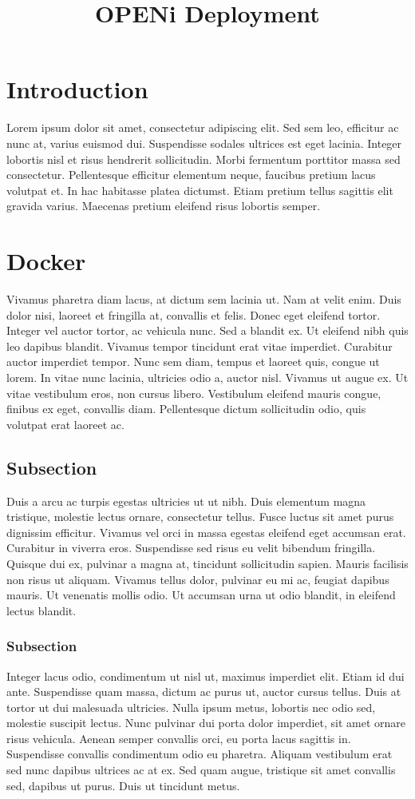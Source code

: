\documentclass[10pt,a4paper]{article}
\title{OPENi Deployment}
\begin{document}
\maketitle

\section{Introduction}
Lorem ipsum dolor sit amet, consectetur adipiscing elit. Sed sem leo, efficitur ac nunc at, varius euismod dui. Suspendisse sodales ultrices est eget lacinia. Integer lobortis nisl et risus hendrerit sollicitudin. Morbi fermentum porttitor massa sed consectetur. Pellentesque efficitur elementum neque, faucibus pretium lacus volutpat et. In hac habitasse platea dictumst. Etiam pretium tellus sagittis elit gravida varius. Maecenas pretium eleifend risus lobortis semper.

\section{Docker}
Vivamus pharetra diam lacus, at dictum sem lacinia ut. Nam at velit enim. Duis dolor nisi, laoreet et fringilla at, convallis et felis. Donec eget eleifend tortor. Integer vel auctor tortor, ac vehicula nunc. Sed a blandit ex. Ut eleifend nibh quis leo dapibus blandit. Vivamus tempor tincidunt erat vitae imperdiet. Curabitur auctor imperdiet tempor. Nunc sem diam, tempus et laoreet quis, congue ut lorem. In vitae nunc lacinia, ultricies odio a, auctor nisl. Vivamus ut augue ex. Ut vitae vestibulum eros, non cursus libero. Vestibulum eleifend mauris congue, finibus ex eget, convallis diam. Pellentesque dictum sollicitudin odio, quis volutpat erat laoreet ac.
\subsection{Subsection}
Duis a arcu ac turpis egestas ultricies ut ut nibh. Duis elementum magna tristique, molestie lectus ornare, consectetur tellus. Fusce luctus sit amet purus dignissim efficitur. Vivamus vel orci in massa egestas eleifend eget accumsan erat. Curabitur in viverra eros. Suspendisse sed risus eu velit bibendum fringilla. Quisque dui ex, pulvinar a magna at, tincidunt sollicitudin sapien. Mauris facilisis non risus ut aliquam. Vivamus tellus dolor, pulvinar eu mi ac, feugiat dapibus mauris. Ut venenatis mollis odio. Ut accumsan urna ut odio blandit, in eleifend lectus blandit.
\subsubsection{Subsection}
Integer lacus odio, condimentum ut nisl ut, maximus imperdiet elit. Etiam id dui ante. Suspendisse quam massa, dictum ac purus ut, auctor cursus tellus. Duis at tortor ut dui malesuada ultricies. Nulla ipsum metus, lobortis nec odio sed, molestie suscipit lectus. Nunc pulvinar dui porta dolor imperdiet, sit amet ornare risus vehicula. Aenean semper convallis orci, eu porta lacus sagittis in. Suspendisse convallis condimentum odio eu pharetra. Aliquam vestibulum erat sed nunc dapibus ultrices ac at ex. Sed quam augue, tristique sit amet convallis sed, dapibus ut purus. Duis ut tincidunt metus.
\end{document}
